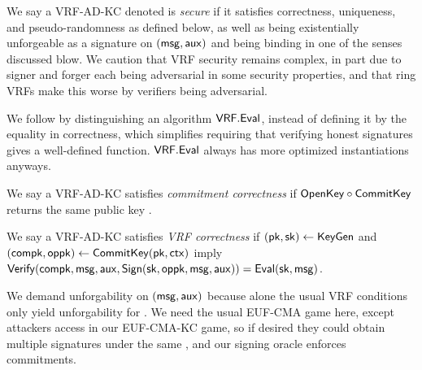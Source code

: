 

We say a VRF-AD-KC denoted \VRF is {\em secure} if it satisfies
 correctness, uniqueness, and pseudo-randomness as defined below,
 as well as being existentially unforgeable as a signature on $(\mathsf{msg},\mathsf{aux})$
 and being binding in one of the senses discussed blow.
We caution that VRF security remains complex, in part due to
signer and forger each being adversarial in some security properties,
and that ring VRFs make this worse by verifiers being adversarial.

We follow \cite{agg_dkg} by distinguishing an algorithm ${\mathsf{VRF}}.{\mathsf{Eval}}$,
 instead of defining it by the equality in correctness,
which simplifies requiring that verifying honest signatures gives a well-defined function.
${\mathsf{VRF}}.{\mathsf{Eval}}$ always has more optimized instantiations anyways.


\begin{definition}
We say a VRF-AD-KC satisfies {\em commitment correctness} if
 ${\mathsf{OpenKey}} \circ {\ensuremath{\mathsf{CommitKey}}}$ returns the same public key \pk.
\end{definition}

\begin{definition}
We say a VRF-AD-KC satisfies {\em VRF correctness} if
$(\mathsf{pk},\mathsf{sk}) \leftarrow {\ensuremath{\mathsf{KeyGen}}}$ and $(\mathsf{compk},\mathsf{oppk}) \leftarrow {\ensuremath{\mathsf{CommitKey}}}(\mathsf{pk},\mathsf{ctx})$
imply
${\mathsf{Verify}}(\mathsf{compk},\mathsf{msg},\mathsf{aux},{\mathsf{Sign}}(\mathsf{sk},\mathsf{oppk},\mathsf{msg},\mathsf{aux})) = {\mathsf{Eval}}(\mathsf{sk},\mathsf{msg})$.
\end{definition}

We demand unforgability on $(\mathsf{msg},\mathsf{aux})$ because alone
 the usual VRF conditions only yield unforgability for \msg.
We need the usual EUF-CMA game here, except attackers access
\CommitKey in our EUF-CMA-KC game, so if desired
 they could obtain multiple signatures under the same \compk,
 and our signing oracle  enforces commitments.

